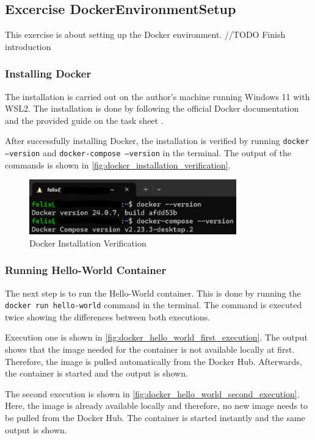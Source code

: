 \subsection{Excercise DockerEnvironmentSetup}
This exercise is about setting up the Docker environment.
//TODO Finish introduction
\subsubsection*{Installing Docker}
The installation is carried out on the author's machine running Windows 11 with WSL2.
The installation is done by following the official Docker documentation \cite{DO-INST} and the provided guide on the task sheet \cite{CM-G-BSD}.

After successfully installing Docker, the installation is verified by running \texttt{docker --version} and \texttt{docker-compose --version} in the terminal.
The output of the commands is shown in \autoref*{fig:docker_installation_verification}.

\begin{figure}
    \centering
    \includegraphics[width=0.8\textwidth]{figures/microservices/dmCar/ms_dmCar_dockerInstallation.png}
    \caption{Docker Installation Verification}
    \label{fig:docker_installation_verification}
\end{figure}
\subsubsection*{Running Hello-World Container}
The next step is to run the Hello-World container.
This is done by running the \texttt{docker run hello-world} command in the terminal.
The command is executed twice showing the differences between both executions.

Execution one is shown in \autoref*{fig:docker_hello_world_first_execution}.
The output shows that the image needed for the container is not available locally at first.
Therefore, the image is pulled automatically from the Docker Hub.
Afterwards, the container is started and the output is shown.

The second execution is shown in \autoref*{fig:docker_hello_world_second_execution}.
Here, the image is already available locally and therefore, no new image needs to be pulled from the Docker Hub.
The container is started instantly and the same output is shown.

